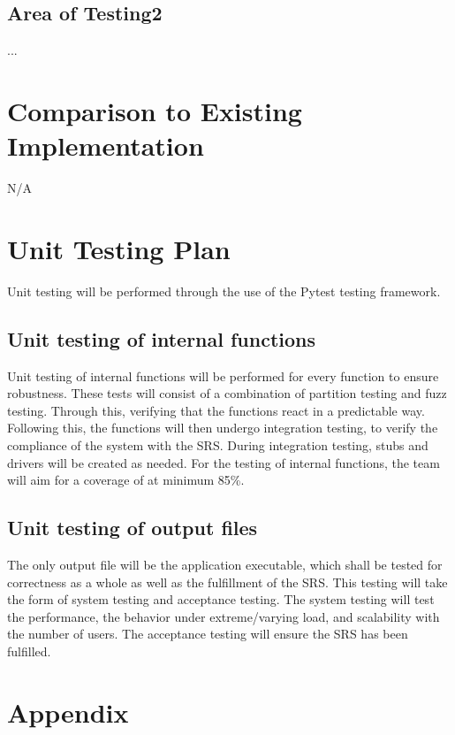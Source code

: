 \documentclass[12pt, titlepage]{article}
\begin{document}
\subsection{Area of Testing2}

...

    
\section{Comparison to Existing Implementation}
N/A

\section{Unit Testing Plan}
Unit testing will be performed through the use of the Pytest testing framework.

\subsection{Unit testing of internal functions}
Unit testing of internal functions will be performed for every function to ensure robustness. These tests will consist of a combination of partition testing and fuzz testing. Through this, verifying that the functions react in a predictable way. Following this, the functions will then undergo integration testing, to verify the compliance of the system with the SRS. During integration testing, stubs and drivers will be created as needed. For the testing of internal functions, the team will aim for a coverage of at minimum 85\%.

\subsection{Unit testing of output files}       
The only output file will be the application executable, which shall be tested for correctness as a whole as well as the fulfillment of the SRS. This testing will take the form of system testing and acceptance testing. The system testing will test the performance, the behavior under extreme/varying load, and scalability with the number of users. The acceptance testing will ensure the SRS has been fulfilled.



\newpage

\section{Appendix}


\end{document}
